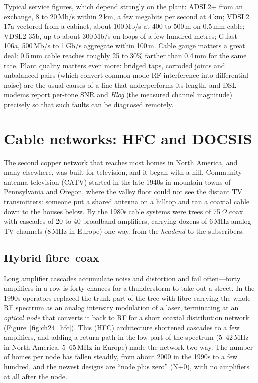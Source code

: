 \begin{inpractice}
Typical service figures, which depend strongly on the plant: ADSL2+ from an exchange, 8 to 20\,Mb/s
within 2\,km, a few megabits per second at 4\,km; VDSL2 17a vectored from a cabinet, about 100\,Mb/s
at 400 to 500\,m on 0.5\,mm cable; VDSL2 35b, up to about 300\,Mb/s on loops of a few hundred metres;
G.fast 106a, 500\,Mb/s to 1\,Gb/s aggregate within 100\,m. Cable gauge matters a great deal: 0.5\,mm
cable reaches roughly 25 to 30\% farther than 0.4\,mm for the same rate. Plant quality matters even
more: bridged taps, corroded joints and unbalanced pairs (which convert common-mode RF interference
into differential noise) are the usual causes of a line that underperforms its length, and DSL
modems report per-tone SNR and \emph{Hlog} (the measured channel magnitude) precisely so that such
faults can be diagnosed remotely.
\end{inpractice}

\section{Cable networks: HFC and DOCSIS}
\label{sec:ch24:cable}

The second copper network that reaches most homes in North America, and many elsewhere, was built
for television, and it began with a hill. Community antenna television (CATV) started in the late
1940s in mountain towns of Pennsylvania and Oregon, where the valley floor could not see the distant
TV transmitters: someone put a shared antenna on a hilltop and ran a coaxial cable down to the houses
below. By the 1980s cable systems were trees of 75\,$\Omega$ coax with cascades of 20 to 40 broadband
amplifiers, carrying dozens of 6\,MHz analog TV channels (8\,MHz in Europe) one way, from the
\emph{headend} to the subscribers.



\subsection{Hybrid fibre--coax}

Long amplifier cascades accumulate noise and distortion and fail often---forty amplifiers in a row
is forty chances for a thunderstorm to take out a street. In the 1990s operators replaced the trunk
part of the tree with fibre carrying the whole RF spectrum as an analog intensity modulation of a
laser, terminating at an \emph{optical node} that converts it back to RF for a short coaxial
distribution network (Figure~\ref{fig:ch24_hfc}). This  (HFC) architecture
shortened cascades to a few amplifiers, and adding a return path in the low part of the spectrum
(5--42\,MHz in North America, 5--65\,MHz in Europe) made the network two-way. The number of homes per
node has fallen steadily, from about 2000 in the 1990s to a few hundred, and the newest designs are
``node plus zero'' (N+0), with no amplifiers at all after the node.



